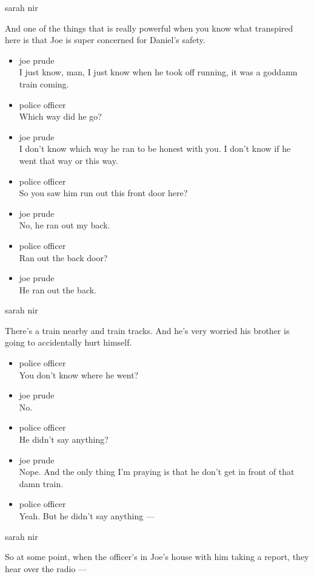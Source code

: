 sarah nir

And one of the things that is really powerful when you know what
transpired here is that Joe is super concerned for Daniel's safety.

\begin{itemize}
\item
  joe prude\\
  I just know, man, I just know when he took off running, it was a
  goddamn train coming.
\item
  police officer\\
  Which way did he go?
\item
  joe prude\\
  I don't know which way he ran to be honest with you. I don't know if
  he went that way or this way.
\item
  police officer\\
  So you saw him run out this front door here?
\item
  joe prude\\
  No, he ran out my back.
\item
  police officer\\
  Ran out the back door?
\item
  joe prude\\
  He ran out the back.
\end{itemize}

sarah nir

There's a train nearby and train tracks. And he's very worried his
brother is going to accidentally hurt himself.

\begin{itemize}
\item
  police officer\\
  You don't know where he went?
\item
  joe prude\\
  No.
\item
  police officer\\
  He didn't say anything?
\item
  joe prude\\
  Nope. And the only thing I'm praying is that he don't get in front of
  that damn train.
\item
  police officer\\
  Yeah. But he didn't say anything ---
\end{itemize}

sarah nir

So at some point, when the officer's in Joe's house with him taking a
report, they hear over the radio ---

